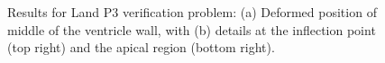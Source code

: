 \begin{figure}[ht!]
{\label{fig:land3-2}}	
%
\caption{Results for Land P3 verification problem: (a) Deformed position of middle of the ventricle wall, with (b) details at the inflection point (top right) and the apical region (bottom right).}
\label{fig:land3}
\end{figure}

\begin{figure}[ht!]
\centering
{}		
\subfigure[]{%
}
\end{figure}
